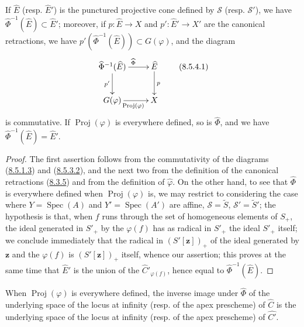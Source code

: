 \begin{proposition}[8.5.4]
\label{II.8.5.4}
If $\widehat{E}$ \textup{(resp. $\widehat{E}'$)} is the punctured projective cone defined
by $\mathcal{S}$ \textup{(resp. $\mathcal{S}'$)}, we have
$\widehat{\Phi}^{-1}(\widehat{E})\subset\widehat{E}'$; moreover, if
$p:\widehat{E}\to X$ and $p':\widehat{E}'\to X'$ are the canonical
retractions, we have
$p'(\widehat{\Phi}^{-1}(\widehat{E}))\subset G(\varphi)$, and the diagram
\begin{equation}
\label{II.8.5.4.1}
  \xymatrix{
    \widehat{\Phi}^{-1}(\widehat{E})
      \ar[r]^{\widehat{\Phi}}\ar[d]_{p'} &
    \widehat{E}\ar[d]^{p}\\
    G(\varphi)\ar[r]_{\operatorname{Proj}(\varphi)} & X
  }
\tag{8.5.4.1}
\end{equation}
is commutative. If $\operatorname{Proj}(\varphi)$ is everywhere defined, so is
$\widehat{\Phi}$, and we have
$\widehat{\Phi}^{-1}(\widehat{E})=\widehat{E}'$.
\end{proposition}

\begin{proof}
The first assertion follows from the commutativity of the diagrams
(\hyperref[II.8.5.1.3]{8.5.1.3}) and
(\hyperref[II.8.5.3.2]{8.5.3.2}), and the next two from the definition
of the canonical retractions (\hyperref[II.8.3.5]{8.3.5}) and from the definition
of $\widehat{\varphi}$. On the other hand, to see that $\widehat{\Phi}$ is
everywhere defined when $\operatorname{Proj}(\varphi)$ is, we
may restrict to considering the case where $Y=\operatorname{Spec}(A)$ and
$Y'=\operatorname{Spec}(A')$ are affine,
$\mathcal{S}=\widetilde{S}$, $\mathcal{S}'=\widetilde{S}'$; the hypothesis is
that, when $f$ runs through the set of homogeneous elements of $S_+$, the ideal
generated in $S'_+$ by the $\varphi(f)$ has as radical in $S'_+$ the ideal
$S'_+$ itself; we conclude immediately that the radical in $(S'[\mathbf{z}])_+$ of
the ideal generated by $\mathbf{z}$ and the $\varphi(f)$ is $(S'[\mathbf{z}])_+$ itself, whence
our assertion; this proves at the same time that $\widehat{E}'$ is the union of the
$\widehat{C}'_{\varphi(f)}$, hence equal to
$\widehat{\Phi}^{-1}(\widehat{E})$.
\end{proof}

\begin{corollary}[8.5.5]
\label{II.8.5.5}
When $\operatorname{Proj}(\varphi)$ is everywhere defined, the inverse image
under $\widehat{\Phi}$ of the underlying space of the locus at infinity \textup{(resp.} of the
apex prescheme\textup{)} of $\widehat{C}$ is the underlying space of the locus at
infinity \textup{(resp.} of the apex prescheme\textup{)} of $\widehat{C'}$.
\end{corollary}


